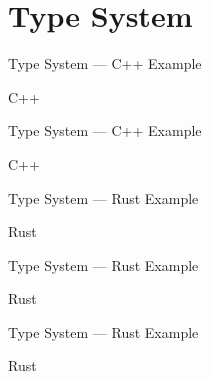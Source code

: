 \documentclass[10pt]{beamer}
\begin{document}
\section{Type System}

\begin{frame}{Type System --- C++ Example}
   \begin{block}{C++}        
        
    \end{block}
\end{frame}

\begin{frame}{Type System --- C++ Example}
    \begin{block}{C++}        
        
    \end{block}
\end{frame}

\begin{frame}{Type System --- Rust Example}
   \begin{block}{Rust}        
        
    \end{block}
\end{frame}

\begin{frame}{Type System --- Rust Example}
   \begin{block}{Rust}        
        
    \end{block}
\end{frame}

\begin{frame}{Type System --- Rust Example}
   \begin{block}{Rust}        
        
    \end{block}
\end{frame}
\end{document}
